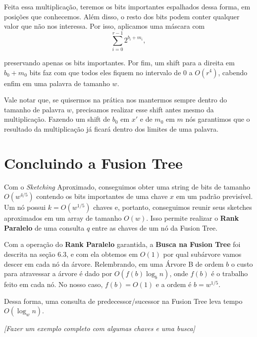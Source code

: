 Feita essa multiplicação, teremos os bits importantes espalhados dessa forma, em
posições que conhecemos. Além disso, o resto dos bits podem conter qualquer
valor que não nos interessa. Por isso, aplicamos uma máscara com
\[
\sum_{i=0}^{r-1} 2^{b_i+m_i},
\]

preservando apenas os bits importantes. Por fim, um shift para a direita em
$b_0+m_0$ bits faz com que todos eles fiquem no intervalo de 0 a $O(r^4)$,
cabendo enfim em uma palavra de tamanho $w$.

Vale notar que, se quisermos na prática nos mantermos sempre dentro do tamanho
de palavra $w$, precisamos realizar esse shift antes mesmo da multiplicação.
Fazendo um shift de $b_0$ em $x'$ e de $m_0$ em $m$ nós garantimos que o
resultado da multiplicação já ficará dentro dos limites de uma palavra.   

\section{Concluindo a Fusion Tree}

Com o \textit{Sketching} Aproximado, conseguimos obter uma string de bits de
tamanho $O(w^{4/5})$ contendo os bits importantes de uma chave $x$ em um padrão
previsível. Um nó possui $k=O(w^{1/5})$ chaves e, portanto, conseguimos reunir
seus sketches aproximados em um array de tamanho $O(w)$. Isso permite realizar o
\textbf{Rank Paralelo} de uma consulta $q$ entre as chaves de um nó da Fusion
Tree.

Com a operação do \textbf{Rank Paralelo} garantida, a \textbf{Busca na Fusion
Tree} foi descrita na seção 6.3, e com ela obtemos em $O(1)$ por qual subárvore
vamos descer em cada nó da árvore. Relembrando, em uma Árvore B de ordem $b$ o
custo para atravessar a árvore é dado por $O(f(b)\log_b n)$, onde $f(b)$ é o
trabalho feito em cada nó. No nosso caso, $f(b)=O(1)$ e a ordem é $b=w^{1/5}$.

Dessa forma, uma consulta de predecessor/sucessor na Fusion Tree leva tempo
$O(\log_w n)$.

\textit{[Fazer um exemplo completo com algumas chaves e uma busca]}
